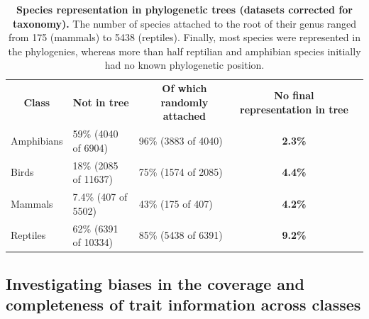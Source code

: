 \vspace{0.35cm}

\begin{table}[h!]
\renewcommand{\baselinestretch}{1}
\renewcommand{\arraystretch}{1.5}
\begin{center}\fontsize{9}{11}\selectfont
\caption[Species representation in phylogenetic trees (datasets corrected for taxonomy)]{\textbf{Species representation in phylogenetic trees (datasets corrected for taxonomy).} The number of species attached to the root of their genus ranged from 175 (mammals) to 5438 (reptiles). Finally, most species were represented in the phylogenies, whereas more than half reptilian and amphibian species initially had no known phylogenetic position.} 
\label{random_attachments_phy}
\begin{tabular}{|l|l|l|c|l}
\cline{1-4}
\multicolumn{1}{|c|}{\textbf{Class}} & \multicolumn{1}{c|}{\textbf{Not in tree}} & \multicolumn{1}{c|}{\textbf{Of which randomly attached}} & \textbf{No final representation in tree} &  \\ \cline{1-4}
Amphibians                  & 59\% (4040 of 6904)                           & 96\% (3883 of 4040)                     & \textbf{2.3\%}             &  \\ \cline{1-4}
Birds                       & 18\% (2085 of 11637)                          & 75\% (1574 of 2085)                    & \textbf{4.4\%}             &  \\ \cline{1-4}
Mammals                     & 7.4\% (407 of 5502)                           & 43\% (175 of 407)                       & \textbf{4.2\%}            &  \\ \cline{1-4}
Reptiles                    & 62\% (6391 of 10334)                          & 85\% (5438 of 6391)                    & \textbf{9.2\%}             &  \\ \cline{1-4}
\end{tabular}
\end{center}
\end{table}


\subsection{Investigating biases in the coverage and completeness of trait information across classes}


